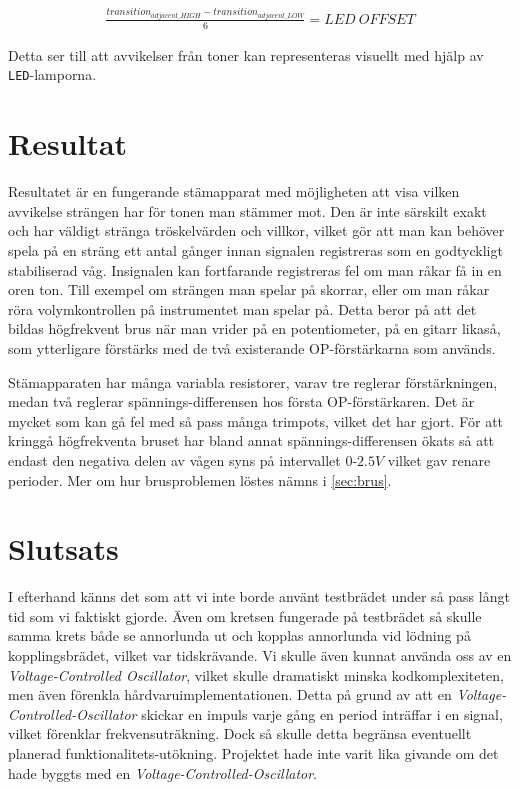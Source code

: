 \documentclass[a4paper]{article}
\begin{document}
\begin{eqnarray} %
\frac{transition_{adjacent\_HIGH} - transition_{adjacent\_LOW}}{6} = LED\ OFFSET
\end{eqnarray}

Detta ser till att avvikelser från toner kan representeras visuellt med hjälp av \texttt{LED}-lamporna.

\section{Resultat}
Resultatet är en fungerande stämapparat med möjligheten att visa vilken avvikelse strängen har för tonen man stämmer mot. Den är inte särskilt exakt och har väldigt stränga tröskelvärden och villkor, vilket gör att man kan behöver spela på en sträng ett antal gånger innan signalen registreras som en godtyckligt stabiliserad våg. Insignalen kan fortfarande registreras fel om man råkar få in en oren ton. Till exempel om strängen man spelar på skorrar, eller om man råkar röra volymkontrollen på instrumentet man spelar på. Detta beror på att det bildas högfrekvent brus när man vrider på en potentiometer, på en gitarr likaså, som ytterligare förstärks med de två existerande OP-förstärkarna som används.

Stämapparaten har många variabla resistorer, varav tre reglerar förstärkningen, medan två reglerar spännings-differensen hos första OP-förstärkaren. Det är mycket som kan gå fel med så pass många trimpots, vilket det har gjort. För att kringgå högfrekventa bruset har bland annat spännings-differensen ökats så att endast den negativa delen av vågen syns på intervallet $0$-$2.5V$ vilket gav renare perioder. Mer om hur brusproblemen löstes nämns i \ref{sec:brus}.

\section{Slutsats}


I efterhand känns det som att vi inte borde använt testbrädet under så pass långt tid som vi faktiskt gjorde. Även om kretsen fungerade på testbrädet så skulle samma krets både se annorlunda ut och kopplas annorlunda vid lödning på kopplingsbrädet, vilket var tidskrävande. Vi skulle även kunnat använda oss av en \textit{Voltage-Controlled Oscillator}, vilket skulle dramatiskt minska kodkomplexiteten, men även förenkla hårdvaruimplementationen. Detta på grund av att en \textit{Voltage-Controlled-Oscillator} skickar en impuls varje gång en period inträffar i en signal, vilket förenklar frekvensuträkning. Dock så skulle detta begränsa eventuellt planerad funktionalitets-utökning. Projektet hade inte varit lika givande om det hade byggts med en \textit{Voltage-Controlled-Oscillator}.
\end{document}
